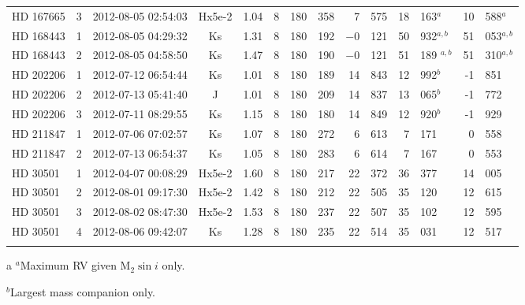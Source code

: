 \begin{table*}
\begin{tabular}{l c c c clll r@{.}l r@{.}l r@{.}l}
                {HD 167665} & 3 & 2012-08-05 02:54:03 & Hx5e-2 	& 1.04  	&8 &180 & 358 & 7         & 575 & 18 & 163$^a$ & 10&588$^a$ \\ %
                {HD 168443} & 1 & 2012-08-05 04:29:32 & Ks     		& 1.31 		& 8& 180& 192 & $-$0   & 121 & 50 & 932$^{a, b}$  & 51&053$^{a, b}$ \\ %
                {HD 168443} & 2 & 2012-08-05 04:58:50 & Ks     		& 1.47 		& 8&180 & 190 & $-$0   & 121 & 51 & 189 $^{a, b}$ & 51&310$^{a, b}$ \\ %
                {HD 202206} & 1 & 2012-07-12 06:54:44 & Ks     		& 1.01 		& 8& 180& 189 & 14      & 843 & 12 & 992$^b$  & -1&851 \\ %
                {HD 202206} & 2 & 2012-07-13 05:41:40 & J       	  & 1.01 	  &8 & 180& 209 & 14      & 837 & 13 & 065$^b$  & -1&772 \\ %
                {HD 202206} & 3 & 2012-07-11 08:29:55 & Ks     		& 1.15		&8 & 180& 180 & 14      & 849 & 12 & 920$^b$  & -1&929 \\ %
                {HD 211847} & 1 & 2012-07-06 07:02:57 & Ks     		& 1.07 		&8 & 180& 272 & 6        & 613 & 7   & 171 & 0& 558\\ %
                {HD 211847} & 2 & 2012-07-13 06:54:37 & Ks     		& 1.05 		&8 & 180& 283 & 6        & 614 & 7   & 167 & 0&553 \\ %
                {HD 30501}  & 1 & 2012-04-07 00:08:29 & Hx5e-2 	 & 1.60 	 &8 & 180& 217 & 22      &  372 & 36 & 377 & 14&005 \\ %
                {HD 30501}  & 2 & 2012-08-01 09:17:30 & Hx5e-2    & 1.42     &8 &180 & 212 & 22      & 505 & 35  & 120 & 12&615 \\ %
                {HD 30501}  & 3 & 2012-08-02 08:47:30 & Hx5e-2 	 & 1.53 	 & 8& 180& 237 & 22      & 507 &  35 & 102 & 12&595 \\ %
                {HD 30501}  & 4 & 2012-08-06 09:42:07 & Ks     		 & 1.28 	 & 8& 180& 235& 22      & 514 & 35 & 031 & 12&517 \\ %
                \bottomrule
                & & & 
        \end{tabular}
        \begin{tablenotes}
          \item  [a] {$^a$}{Maximum RV given \(\textrm{M}_2\sin{i}\) only.}
          \item  {$^b$}{Largest mass companion only.}
        \end{tablenotes}
    \label{tab:observations}
\end{table*}